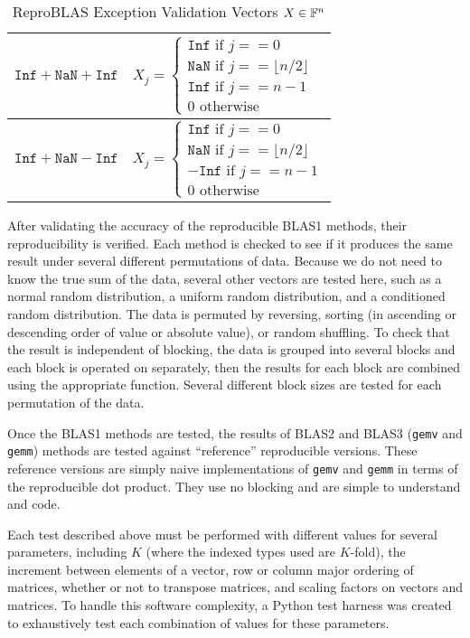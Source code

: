 \begin{table}[!htbp]
\begin{tabular}{ | l |  l |}
            $\texttt{Inf} + \texttt{NaN} + \texttt{Inf}$ & $X_j = \begin{cases} \texttt{Inf} \text{ if } j == 0 \\ \texttt{NaN} \text{ if } j == \lfloor n/2 \rfloor \\ \texttt{Inf} \text{ if } j == n - 1 \\ 0 \text{ otherwise} \end{cases}$\\ \hline
            $\texttt{Inf} + \texttt{NaN} - \texttt{Inf}$ & $X_j = \begin{cases} \texttt{Inf} \text{ if } j == 0 \\ \texttt{NaN} \text{ if } j == \lfloor n/2 \rfloor \\ -\texttt{Inf} \text{ if } j == n - 1 \\ 0 \text{ otherwise} \end{cases}$\\ \hline
        \end{tabular}
        \caption{ReproBLAS Exception Validation Vectors $X \in \mathbb{F}^n$}
        \label{tbl:validateinfblas1data}
    \end{table}

  After validating the accuracy of the reproducible BLAS1 methods, their reproducibility is verified. Each method is checked to see if it produces the same result under several different permutations of data. Because we do not need to know the true sum of the data, several other vectors are tested here, such as a normal random distribution, a uniform random distribution, and a conditioned random distribution. The data is permuted by reversing, sorting (in ascending or descending order of value or absolute value), or random shuffling. To check that the result is independent of blocking, the data is grouped into several blocks and each block is operated on separately, then the results for each block are combined using the appropriate function. Several different block sizes are tested for each permutation of the data.

  Once the BLAS1 methods are tested, the results of BLAS2 and BLAS3 (\texttt{gemv} and \texttt{gemm}) methods are tested against ``reference'' reproducible versions. These reference versions are simply naive implementations of \texttt{gemv} and \texttt{gemm} in terms of the reproducible dot product. They use no blocking and are simple to understand and code.

  Each test described above must be performed with different values for several parameters, including $K$ (where the indexed types used are $K$-fold), the increment between elements of a vector, row or column major ordering of matrices, whether or not to transpose matrices, and scaling factors on vectors and matrices. To handle this software complexity, a Python test harness was created to exhaustively test each combination of values for these parameters.
